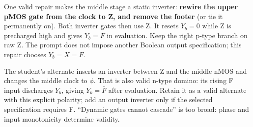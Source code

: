 \documentclass[10pt]{article}
\newcommand{\mos}[4]{\begin{scope}[shift={(#1,#2)}]
\draw (0,.24)--(0,-.24);\draw (0,.20)--(.25,.20)--(.25,.5);
\draw (0,-.20)--(.25,-.20)--(.25,-.5);\draw (-.16,.23)--(-.16,-.23);
\ifnum#4=1\draw (-.26,0) circle (.06);\draw (-.75,0)--(-.32,0);\else\draw (-.75,0)--(-.16,0);\fi
\node[anchor=east,font=\scriptsize] at (-.76,0) {$#3$};\end{scope}}
\newcommand{\ground}[2]{\draw (#1,#2)--(#1,{#2-.12});\draw ({#1-.17},{#2-.12})--({#1+.17},{#2-.12});\draw ({#1-.11},{#2-.20})--({#1+.11},{#2-.20});}
\newcommand{\rail}[3]{\draw (#1,#2)--(#1,{#2+.14});\node[above,font=\scriptsize] at (#1,{#2+.14}) {$#3$};}
\begin{document}
One valid repair makes the middle stage a static inverter: \textbf{rewire the upper pMOS gate from the clock to Z, and remove the footer} (or tie it permanently on). Both inverter gates then use Z. It resets $Y_b=0$ while Z is precharged high and gives $Y_b=F$ in evaluation. Keep the right p-type branch on raw Z. The prompt does not impose another Boolean output specification; this repair chooses $Y_b=X=F$.
\begin{center}\end{center}
The student's alternate inserts an inverter between Z and the middle nMOS and changes the middle clock to $\phi$. That is also valid n-type domino: its rising F input discharges $Y_b$, giving $Y_b=\bar F$ after evaluation. Retain it as a valid alternate with this explicit polarity; add an output inverter only if the selected specification requires F. ``Dynamic gates cannot cascade'' is too broad: phase and input monotonicity determine validity.
\end{document}

